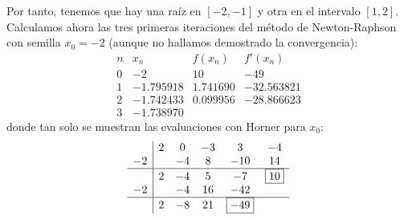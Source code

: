 \begin{ejercicio}
    Por tanto, tenemos que hay una raíz en $[-2,-1]$ y otra en el intervalo $[1,2]$.
    Calculamos ahora las tres primeras iteraciones del método de Newton-Raphson con semilla $x_0=-2$ (aunque no hallamos demostrado la convergencia):
    \begin{equation*}
        \begin{array}{c|c|c|c}
            n & x_n & f(x_n) & f'(x_n)\\ \hline
            0 & -2 & 10 & -49\\
            1 & -1.795918 & 1.741690 & -32.563821\\
            2 & -1.742433 & 0.099956 & -28.866623\\
            3 & -1.738970
        \end{array}
    \end{equation*}
    donde tan solo se muestran las evaluaciones con Horner para $x_0$:
    \begin{equation*}
        \begin{array}{c|cccccc}
                & 2 & 0 & -3 & 3 & -4 \\
            -2 &   & -4 & 8 & -10 & 14\\          \hline
            & 2 & -4 & 5 & -7 & \boxed{10}\\
            -2 & & -4 & 16 & -42 \\ \hline
            & 2 & -8 & 21 & \boxed{-49} \\
        \end{array}
    \end{equation*}
\end{ejercicio}

